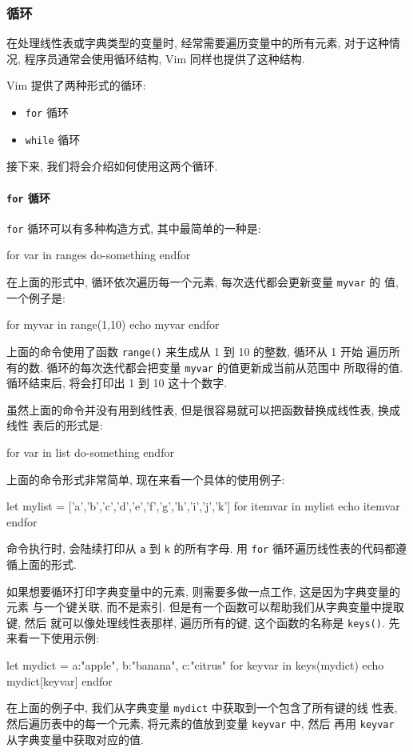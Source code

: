 \subsubsection{循环}
\label{subsubsec:loops}

在处理线性表或字典类型的变量时, 经常需要遍历变量中的所有元素, 对于这种情况,
程序员通常会使用循环结构, Vim 同样也提供了这种结构.

Vim 提供了两种形式的循环:
\begin{itemize}
	\item \texttt{for} 循环
	\item \texttt{while} 循环
\end{itemize}
接下来, 我们将会介绍如何使用这两个循环.

\paragraph{\texttt{for} 循环}
\label{para:for_loops}

\texttt{for} 循环可以有多种构造方式, 其中最简单的一种是:
\begin{vimcode}
for var in ranges
	do-something
endfor
\end{vimcode}
在上面的形式中, 循环依次遍历每一个元素, 每次迭代都会更新变量 \texttt{myvar} 的
值, 一个例子是:
\begin{vimcode}
for myvar in range(1,10)
	echo myvar
endfor
\end{vimcode}
上面的命令使用了函数 \texttt{range()} 来生成从 1 到 10 的整数, 循环从 1 开始
遍历所有的数. 循环的每次迭代都会把变量 \texttt{myvar} 的值更新成当前从范围中
所取得的值. 循环结束后, 将会打印出 1 到 10 这十个数字.

虽然上面的命令并没有用到线性表, 但是很容易就可以把函数替换成线性表, 换成线性
表后的形式是:
\begin{vimcode}
for var in list
	do-something
endfor
\end{vimcode}
上面的命令形式非常简单, 现在来看一个具体的使用例子:
\begin{vimcode}
let mylist = ['a','b','c','d','e','f','g','h','i','j','k']
for itemvar in mylist
    echo itemvar
endfor
\end{vimcode}
命令执行时, 会陆续打印从 \texttt{a} 到 \texttt{k} 的所有字母. 用 \texttt{for}
循环遍历线性表的代码都遵循上面的形式.

如果想要循环打印字典变量中的元素, 则需要多做一点工作, 这是因为字典变量的元素
与一个键关联, 而不是索引. 但是有一个函数可以帮助我们从字典变量中提取键, 然后
就可以像处理线性表那样, 遍历所有的键, 这个函数的名称是 \texttt{keys()}. 先
来看一下使用示例:
\begin{vimcode}
let mydict = {a:"apple", b:"banana", c:"citrus" }
for keyvar in keys(mydict)
    echo mydict[keyvar]
endfor
\end{vimcode}
在上面的例子中, 我们从字典变量 \texttt{mydict} 中获取到一个包含了所有键的线
性表, 然后遍历表中的每一个元素, 将元素的值放到变量 \texttt{keyvar} 中, 然后
再用 \texttt{keyvar} 从字典变量中获取对应的值.

